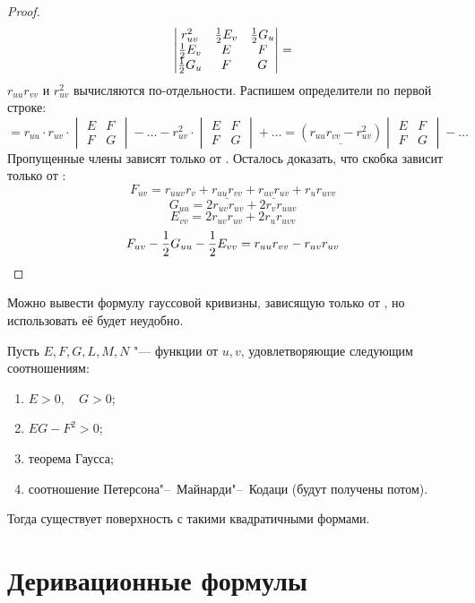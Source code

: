 \begin{proof}
$$\begin{vmatrix}
		r_{uv}^2 & \frac{1}2 E_v & \frac{1}2 G_u \\
		\frac{1}2 E_v & E & F \\
		\frac{1}2 G_u & F & G
	\end{vmatrix} = $$
	$ r_{uu}r_{vv} $ и $ r_{uv}^2 $  вычисляются по-отдельности. Распишем определители по первой строке:
	$$ = r_{uu} \cdot r_{uv} \cdot
	\begin{vmatrix}
		E & F \\
		F & G
	\end{vmatrix} - \dots - r_{uv}^2 \cdot
	\begin{vmatrix}
		E & F \\
		F & G
	\end{vmatrix} + \dots = \underline{(r_{uu}r_{vv} - r_{uv}^2)}
	\begin{vmatrix}
		E & F \\
		F & G
	\end{vmatrix} - \dots $$
	Пропущенные члены зависят только от . Осталось доказать, что скобка зависит только от :
	$$ F_{uv} = r_{uuv}r_v + \underline{r_{uu}r_{vv}} + \underline{r_{uv}r_{uv}} + r_ur_{uvv} $$
	$$ G_{uu} = 2r_{uv}r_{uv} + 2r_vr_{uuv} $$
	$$ E_{vv} = 2r_{uv}r_{uv} + 2r_ur_{uvv} $$
	$$ F_{uv} - \frac{1}2 G_{uu} - \frac{1}2 E_{vv} = r_{uu}r_{vv} - r_{uv}r_{uv} $$
\end{proof}

\begin{remark}
	Можно вывести формулу гауссовой кривизны, зависящую только от , но использовать её будет неудобно.
\end{remark}

\begin{theorem}[Петерсона]
	Пусть $ E, F, G, L, M, N $ "--- функции от $ u, v $, удовлетворяющие следующим соотношениям:
	\begin{enumerate}
		\item $ E > 0, \quad G > 0 $;
		\item $ EG - F^2 > 0 $;
		\item теорема Гаусса;
		\item соотношение Петерсона"--~Майнарди"--~Кодаци (будут получены потом).
	\end{enumerate}
	Тогда существует поверхность с такими квадратичными формами.
\end{theorem}

\begin{noproof}
\end{noproof}

\section{Деривационные формулы}

